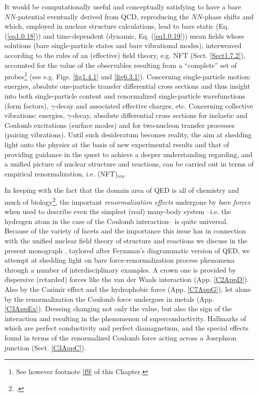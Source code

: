 It would be computationally useful and conceptually satisfying to have a bare $NN$-potential eventually derived from QCD, reproducing the $NN$-phase shifts and which, employed in nuclear structure calculations, lead to bare static (Eq. (\ref{eq1.0.18})) and  time-dependent (dynamic, Eq. (\ref{eq1.0.19})) mean fields whose solutions (bare single-particle states and bare vibrational modes), interweaved according to the rules of an (effective) field theory, e.g. NFT (Sect. \ref{Sect1.7.2}), accounted for the value of the observables resulting from a ``complete'' set of probes\footnote{See however footnote \ref{f9} of this Chapter.} (see e.g. Figs. \ref{fig1.4.1} and \ref{fig6.3.1}). Concerning single-particle motion: energies, absolute one-particle transfer differential cross sections and thus insight into both single-particle content and renormalized single-particle wavefunctions (form factors), $\gamma$-decay and associated effective charges, etc. Concerning collective vibrations: energies, $\gamma$-decay, absolute differential cross sections for inelastic and Coulomb excitations (surface modes) and for two-nucleon transfer processes (pairing vibrations).
Until such desideratum becomes reality, the aim at shedding light onto the physics at the basis of new experimental results and that of providing guidance in the quest to achieve a deeper understanding regarding, and a unified picture of nuclear structure and reactions, can be carried out in terms of empirical renormalization, i.e. (NFT)$_{\text{ren}}$.  

In keeping with the fact that the domain area of QED is all of chemistry and much of biology\footnote{\cite{Feynman:06}.}, the important \textit{renormalization effects} undergone by \textit{bare forces} when used to describe even the simplest (real) many-body system --i.e. the hydrogen atom in the case of the Coulomb interaction-- is quite universal. Because of the variety of facets and the importance this issue has in connection with the unified nuclear field theory of structure and reactions we discuss in the present monograph , taylored after Feynman's diagrammatic version of QED, we attempt at shedding light on bare force-renormalization process phenomena through a number of interdisciplinary examples. A crown one is provided by dispersive (retarded) forces like the van der Waals interaction (App. \ref{C2AppD}). Also by the Casimir effect and the hydrophobic force (App. \ref{C7AppG}), let alone by the renormalization the Coulomb force undergoes in metals (App. \ref{C3AppEx}). Dressing changing not only the value, but also the sign of the interaction and resulting in the phenomenon of superconductivity. Hallmarks of which are perfect conductivity and perfect diamagnetism, and the special effects found in terms of the renormalized Coulomb force acting across a Josephson junction (Sect. \ref{C3AppC}). 


